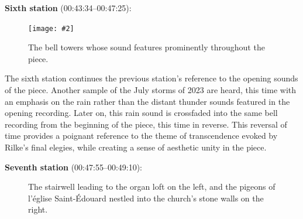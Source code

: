 \documentclass[12pt,twoside,maitrise]{dms_ks}
\newcommand{\customincludegraphics}[4][]{%
    \begin{figure}[H]
        \centering
        \texttt{[image: \#2]}
        \caption{#4}
	\label{#3} 
    \end{figure}
}
\theoremstyle{definition}
\begin{document}
{\textbf{Sixth station} (00:43:34--00:47:25):

\customincludegraphics[scale=0.07]{eglise_mh.JPG}{station6}{The bell towers whose sound features prominently throughout the piece.}%

The sixth station continues the previous station's reference to the opening sounds of the piece. 
Another sample of the July storms of 2023 are heard, this time with an emphasis on the rain rather than the distant thunder sounds featured in the opening recording. 
Later on, this rain sound is crossfaded into the same bell recording from the beginning of the piece, this time in reverse. 
This reversal of time provides a poignant reference to the theme of transcendence evoked by Rilke's final elegies, while creating a sense of aesthetic unity in the piece.

\textbf{Seventh station} (00:47:55--00:49:10):

\begin{figure}[h]
    \centering
    \caption{The stairwell leading to the organ loft on the left, and the pigeons of l'église Saint-Édouard nestled into the church's stone walls on the right.}
    \label{fig:station7}
\end{figure}

}
\end{document}
